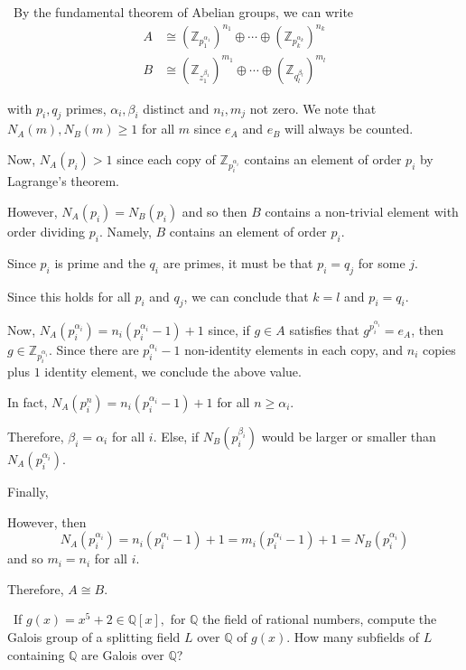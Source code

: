 \documentclass[12pt]{AlgebraQual}
\begin{document}
\begin{solution}$\,$
By the fundamental theorem of Abelian groups, we can write \begin{align*}
    A&\cong(\mathbb{Z}_{p_1^{\alpha_1}})^{n_1}\oplus\cdots\oplus(\mathbb{Z}_{p_k^{\alpha_k}})^{n_k}\\
    B&\cong(\mathbb{Z}_{z_1^{\beta_1}})^{m_1}\oplus\cdots\oplus(\mathbb{Z}_{q_l^{\beta_l}})^{m_l}
\end{align*}

with $p_i,q_j$ primes, $\alpha_i,\beta_i$ distinct and $n_i,m_j$ not zero. We note that $N_A(m),N_B(m)\ge1$ for all $m$ since $e_A$ and $e_B$ will always be counted.

Now, $N_A(p_i)>1$ since each copy of $\mathbb{Z}_{p_i^{\alpha_i}}$ contains an element of order $p_i$ by Lagrange's theorem.

However, $N_A(p_i)=N_B(p_i)$ and so then $B$ contains a non-trivial element with order dividing $p_i$. Namely, $B$ contains an element of order $p_i$.

Since $p_i$ is prime and the $q_i$ are primes, it must be that $p_i=q_j$ for some $j$.

Since this holds for all $p_i$ and $q_j$, we can conclude that $k=l$ and $p_i=q_i$.

Now, $N_A(p_i^{\alpha_i})=n_i(p_i^{\alpha_i}-1)+1$ since, if $g\in A$ satisfies that $g^{p_i^{\alpha_i}}=e_A$, then $g\in \mathbb{Z}_{p_i^{\alpha_i}}$. Since there are $p_i^{\alpha_i}-1$ non-identity elements in each copy, and $n_i$ copies plus $1$ identity element, we conclude the above value.

In fact, $N_A(p_i^n)=n_i(p_i^{\alpha_i}-1)+1$ for all $n\ge \alpha_i$.

Therefore, $\beta_i=\alpha_i$ for all $i$. Else, if $N_B(p_i^{\beta_i})$ would be larger or smaller than $N_A(p_i^{\alpha_i})$.

Finally,

However, then $$N_A(p_i^{\alpha_i})=n_i(p_i^{\alpha_i}-1)+1=m_i(p_i^{\alpha_i}-1)+1=N_B(p_i^{\alpha_i})$$ and so $m_i=n_i$ for all $i$.

Therefore, $A\cong B.$
\end{solution}
\newpage

\begin{problem} $\,$
If $g(x)=x^5+2\in\mathbb{Q}[x],$ for $\mathbb{Q}$ the field of rational numbers, compute the Galois group of a splitting field $L$ over $\mathbb{Q}$ of $g(x).$ How many subfields of $L$ containing $\mathbb{Q}$ are Galois over $\mathbb{Q}$?
\end{problem}
\end{document}
